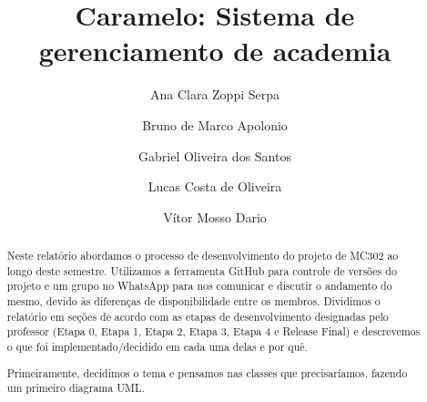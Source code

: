 \documentclass[11pt,twoside]{article}
\begin{document}
%

%



\TRMakeCover


%

%
\title{Caramelo: Sistema de gerenciamento de academia}

\author{
Ana Clara Zoppi Serpa
\and
Bruno de Marco Apolonio
\and
Gabriel Oliveira dos Santos
\and
Lucas Costa de Oliveira
\and
Vítor Mosso Dario
}

\date{}

\maketitle


\begin{abstract}
Neste relatório abordamos o processo de desenvolvimento do projeto de MC302 ao longo deste semestre. Utilizamos a ferramenta
GitHub para controle de versões do projeto e um grupo no WhatsApp para nos comunicar e discutir o andamento do mesmo, devido às
diferenças de disponibilidade entre os membros. Dividimos o relatório em seções de acordo com as etapas de desenvolvimento
designadas pelo professor (Etapa 0, Etapa 1, Etapa 2, Etapa 3, Etapa 4 e Release Final) e descrevemos o que foi implementado/decidido
em cada uma delas e por quê.

Primeiramente, decidimos o tema e pensamos nas classes que precisaríamos, fazendo um primeiro diagrama UML.
\end{abstract}
\end{document}
